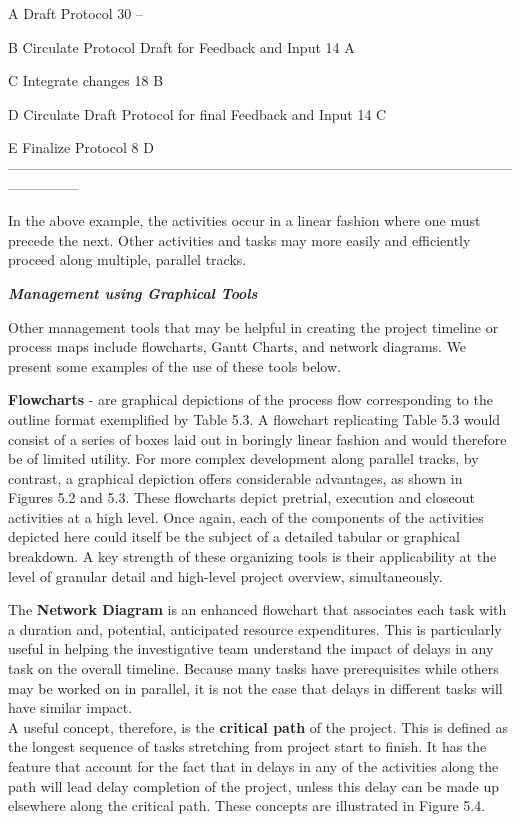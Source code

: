 \documentclass[]{book}
\begin{document}
A Draft Protocol 30 --

B Circulate Protocol Draft for Feedback and Input 14 A

C Integrate changes 18 B

D Circulate Draft Protocol for final Feedback and Input 14 C

E Finalize Protocol 8 D
---------------------------------------------------------------------------------------------------------------------------

In the above example, the activities occur in a linear fashion where one
must precede the next. Other activities and tasks may more easily and
efficiently proceed along multiple, parallel tracks.

\textbf{\emph{Management using Graphical Tools}}

Other management tools that may be helpful in creating the project
timeline or process maps include flowcharts, Gantt Charts, and network
diagrams. We present some examples of the use of these tools below.

\textbf{Flowcharts} - are graphical depictions of the process flow
corresponding to the outline format exemplified by Table 5.3. A
flowchart replicating Table 5.3 would consist of a series of boxes laid
out in boringly linear fashion and would therefore be of limited
utility. For more complex development along parallel tracks, by
contrast, a graphical depiction offers considerable advantages, as shown
in Figures 5.2 and 5.3. These flowcharts depict pretrial, execution and
closeout activities at a high level. Once again, each of the components
of the activities depicted here could itself be the subject of a
detailed tabular or graphical breakdown. A key strength of these
organizing tools is their applicability at the level of granular detail
and high-level project overview, simultaneously.

The \textbf{Network Diagram} is an enhanced flowchart that associates
each task with a duration and, potential, anticipated resource
expenditures. This is particularly useful in helping the investigative
team understand the impact of delays in any task on the overall
timeline. Because many tasks have prerequisites while others may be
worked on in parallel, it is not the case that delays in different tasks
will have similar impact.\\[2\baselineskip]A useful concept, therefore,
is the \textbf{critical path} of the project. This is defined as the
longest sequence of tasks stretching from project start to finish. It
has the feature that account for the fact that in delays in any of the
activities along the path will lead delay completion of the project,
unless this delay can be made up elsewhere along the critical path.
These concepts are illustrated in Figure 5.4.
\end{document}
